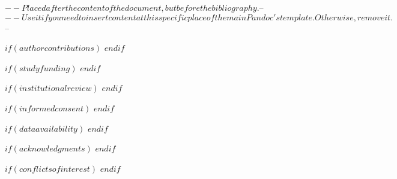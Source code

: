 $-- Placed after the content of the document, but before the bibliography.
$-- %
$-- Use it if you need to insert content at this specific place of the main Pandoc's template. Otherwise, remove it.
$-- %

$if(authorcontributions)$
$endif$

$if(studyfunding)$
$endif$

$if(institutionalreview)$
$endif$

$if(informedconsent)$
$endif$

$if(dataavailability)$
$endif$

$if(acknowledgments)$
$endif$

$if(conflictsofinterest)$
$endif$

